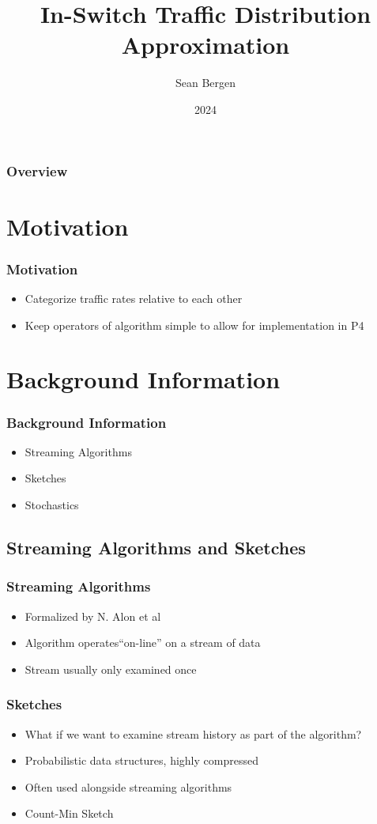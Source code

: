 \documentclass{beamer}
\title{In-Switch Traffic Distribution Approximation}
\author{Sean Bergen}
\institute{Arizona State University}
\date{2024}
\begin{document}
\frame{\titlepage}

\begin{frame}
  \frametitle{Overview}
  \tableofcontents
\end{frame}

\section{Motivation}
\begin{frame}
  \frametitle{Motivation}
  \begin{itemize}
    \item <2-> Categorize traffic rates relative to each other
    \item <3-> Keep operators of algorithm simple to allow for implementation in P4
  \end{itemize}  
\end{frame}

\section{Background Information}
\begin{frame}
  \frametitle{Background Information}
  \begin{itemize}
    \item Streaming Algorithms
    \item Sketches
    \item Stochastics
  \end{itemize}
\end{frame}


\subsection{Streaming Algorithms and Sketches}
\begin{frame}
  \frametitle{Streaming Algorithms}
  \begin{itemize}
    \item<2-> Formalized by N. Alon et al\cite{noga}
    \item<3-> Algorithm operates``on-line'' on a stream of data
    \item<4-> Stream usually only examined once
  \end{itemize}
\end{frame}

\begin{frame}
  \frametitle{Sketches}
  \begin{itemize}
    \item What if we want to examine stream history as part of the algorithm?
    \item<2-> Probabilistic data structures, highly compressed\cite{sketch}
    \item<3-> Often used alongside streaming algorithms
    \item<4-> Count-Min Sketch\cite{cms}
  \end{itemize}
\end{frame}
\end{document}

